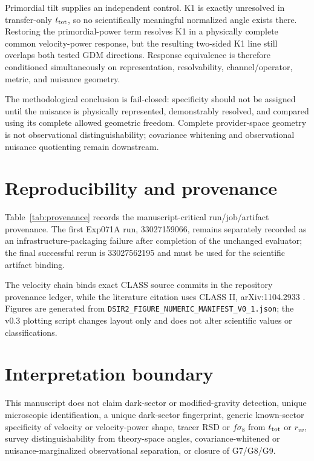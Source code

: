 \documentclass[11pt]{article}
\newcommand{\ttot}{t_{\rm tot}}
\begin{document}
Primordial tilt supplies an independent control. K1 is exactly unresolved in transfer-only $\ttot$, so no scientifically meaningful normalized angle exists there. Restoring the primordial-power term resolves K1 in a physically complete common velocity-power response, but the resulting two-sided K1 line still overlaps both tested GDM directions. Response equivalence is therefore conditioned simultaneously on representation, resolvability, channel/operator, metric, and nuisance geometry.

The methodological conclusion is fail-closed: specificity should not be assigned until the nuisance is physically represented, demonstrably resolved, and compared using its complete allowed geometric freedom. Complete provider-space geometry is not observational distinguishability; covariance whitening and observational nuisance quotienting remain downstream.

\section{Reproducibility and provenance}
Table~\ref{tab:provenance} records the manuscript-critical run/job/artifact provenance. The first Exp071A run, 33027159066, remains separately recorded as an infrastructure-packaging failure after completion of the unchanged evaluator; the final successful rerun is 33027562195 and must be used for the scientific artifact binding.

The velocity chain binds exact CLASS source commits in the repository provenance ledger, while the literature citation uses CLASS II, arXiv:1104.2933 \citep{BlasLesgourguesTram2011CLASSII}. Figures are generated from \texttt{DSIR2\_FIGURE\_NUMERIC\_MANIFEST\_V0\_1.json}; the v0.3 plotting script changes layout only and does not alter scientific values or classifications.



\section*{Interpretation boundary}
This manuscript does not claim dark-sector or modified-gravity detection, unique microscopic identification, a unique dark-sector fingerprint, generic known-sector specificity of velocity or velocity-power shape, tracer RSD or $f\sigma_8$ from $\ttot$ or $r_{vv}$, survey distinguishability from theory-space angles, covariance-whitened or nuisance-marginalized observational separation, or closure of G7/G8/G9.



\end{document}
